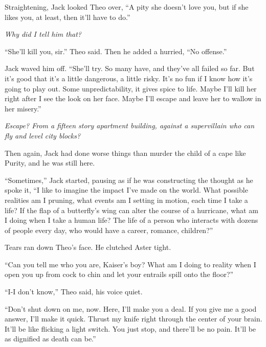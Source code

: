 Straightening, Jack looked Theo over, ``A pity she doesn't love you, but if she likes you, at least, then it'll have to do.''



\emph{Why did I tell him that?}



``She'll kill you, sir.''  Theo said.  Then he added a hurried, ``No offense.''



Jack waved him off.  ``She'll try.  So many have, and they've all failed so far.  But it's good that it's a little dangerous, a little risky.  It's no fun if I know how it's going to play out.  Some unpredictability, it gives spice to life.  Maybe I'll kill her right after I see the look on her face.  Maybe I'll escape and leave her to wallow in her misery.''



\emph{Escape?  From a fifteen story apartment building, against a supervillain who can fly and level city blocks?}



Then again, Jack had done worse things than murder the child of a cape like Purity, and he was still here.



``Sometimes,'' Jack started, pausing as if he was constructing the thought as he spoke it, ``I like to imagine the impact I've made on the world.  What possible realities am I pruning, what events am I setting in motion, each time I take a life?  If the flap of a butterfly's wing can alter the course of a hurricane, what am I doing when I take a human life?  The life of a person who interacts with dozens of people every day, who would have a career, romance, children?''



Tears ran down Theo's face.  He clutched Aster tight.



``Can you tell me who you are, Kaiser's boy?  What am I doing to reality when I open you up from cock to chin and let your entrails spill onto the floor?''



``I-I don't know,'' Theo said, his voice quiet.



``Don't shut down on me, now.  Here, I'll make you a deal.  If you give me a good answer, I'll make it quick.  Thrust my knife right through the center of your brain.  It'll be like flicking a light switch.  You just stop, and there'll be no pain.  It'll be as dignified as death can be.''



